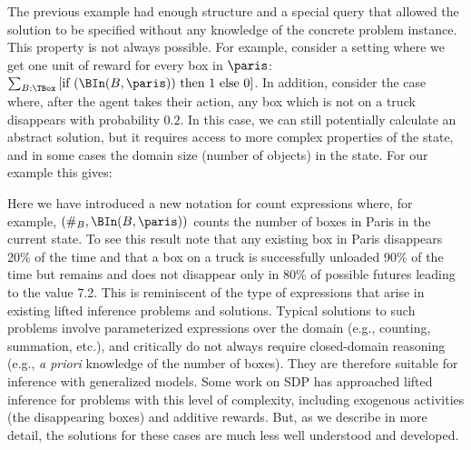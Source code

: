 The previous example had enough structure and a special query that allowed the solution to be specified without any knowledge of the concrete problem instance. This property is not always possible.  
%
For example, consider a setting 
where we get one unit of reward for every box in $\paris$: 
$\sum_{B:\TBox} \mbox{[if $(\BIn(B,\paris))$ then 1 else 0]}$.
In addition, consider the case where, after the agent takes their action, any box which is not on a truck disappears with probability $0.2$.
In this case, we can still potentially calculate an abstract solution, but it requires access to more complex properties of the state, and in some cases the domain size (number of objects) in the state. For our example this gives:
\begin{center}
\vspace{-4mm}
\end{center}
Here we have introduced a new notation for count expressions where, for example, $(\#_B, \BIn(B,\paris))$ counts the number of boxes in Paris in the current state. 
To see this result note that any existing box in Paris disappears 20\% of the time and that
a box on a truck is successfully unloaded 90\% of the time but remains and does not disappear only in 80\% of possible futures leading to the value 7.2.
This is reminiscent of the type of expressions that arise in existing lifted inference problems and solutions. 
Typical solutions to such problems
%
%
%
%
involve parameterized expressions over the domain (e.g., counting, summation, etc.),
and critically do not always require closed-domain reasoning (e.g., \textit{a priori}
knowledge of the number of boxes).  They are therefore suitable for inference with generalized models.
Some work on SDP has approached lifted inference for problems with this level of complexity, including exogenous activities (the disappearing boxes) and additive rewards.
But, as we describe in more detail, the solutions for these cases are much less well understood and developed. 


%
%
%
%
%
%

